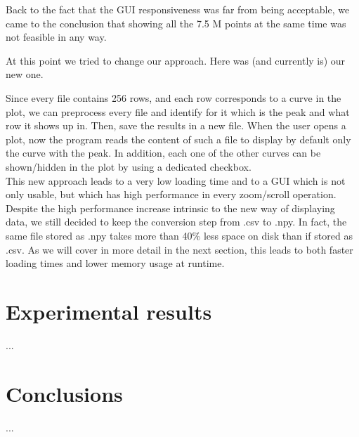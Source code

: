 \documentclass[11pt,a4paper]{article}
\begin{document}
Back to the fact that the GUI responsiveness was far from being acceptable, we came to the conclusion that showing all the 7.5 M points at the same time was not feasible in any way.

At this point we tried to change our approach. Here was (and currently is) our new one.

Since every file contains 256 rows, and each row corresponds to a curve in the plot, we can preprocess every file and identify for it which is the peak and what row it shows up in. Then, save the results in a new file.
When the user opens a plot, now the program reads the content of such a file to display by default only the curve with the peak. In addition, each one of the other curves can be shown/hidden in the plot by using a dedicated checkbox.\\

This new approach leads to a very low loading time and to a GUI which is not only usable, but which has high performance in every zoom/scroll operation.\\

Despite the high performance increase intrinsic to the new way of displaying data, we still decided to keep the conversion step from .csv to .npy.
In fact, the same file stored as .npy takes more than 40\% less space on disk than if stored as .csv.
As we will cover in more detail in the next section, this leads to both faster loading times and lower memory usage at runtime.

\section{Experimental results}
\label{sec:experimental-results}

...

\section{Conclusions}
\label{sec:conclusions}

...

\end{document}
